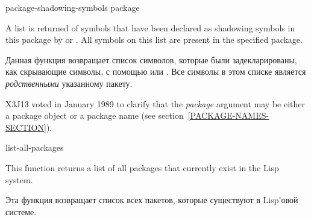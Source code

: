 \begin{defun}[Function]
package-shadowing-symbols package

A list is returned of symbols that have been declared as shadowing
symbols in this package by  or .  All
symbols on this list are present in the specified package.

Данная функция возвращает список символов, которые были задекларированы, как
скрывающие символы, с помощью  или . Все
символы в этом списке является \emph{родственными} указанному пакету.

\begin{new}
X3J13 voted in January 1989
to clarify that the \emph{package} argument may be either a package object
or a package name (see section~\ref{PACKAGE-NAMES-SECTION}).
\end{new}
\end{defun}

\begin{defun}[Function]
list-all-packages 

This function returns a list of all packages that currently exist in the
Lisp system.

Эта функция возвращает список всех пакетов, которые существуют в Lisp'овой
системе. 
\end{defun}


